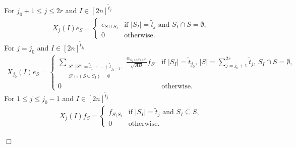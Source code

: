 \documentclass[11pt]{article}
\newcommand{\1}{\mathbf{1}}
\theoremstyle{plain}
\theoremstyle{definition}
\theoremstyle{remark}
\renewenvironment{proof}[1][]{
    	\begin{trivlist}
     	\item[\hspace{\labelsep}{\em\noindent Proof#1:\/}]}
     	{{\hfill$\Box$}
    	\end{trivlist}
  }
\begin{document}
\begin{proof}
    For $j_0+1\leq j\leq 2r$ and $I\in [2n]^{\tilde t_j}$ 
 \begin{align*}
 X_j(I)e_S=
\begin{cases}
   e_{S\cup S_{I}} & \text{if } |S_I|=\tilde t_j \text{  and  }S_{I}\cap  S=\emptyset,\\
  0  & \text{otherwise. } 
\end{cases}
    \end{align*}
    For $j=j_0$ and $I\in [2n]^{\tilde t_{j_0}}$ 
   \begin{align*}
X_{j_0}(I)e_S=
\begin{cases}
  \sum_{\substack{S':|S'|= \widetilde t_1+\dots+\widetilde t_{j_0-1},\\S'\cap(S\cup S_{I})=\emptyset}} \frac{\alpha_{S_I\cup S\cup S'}}{\sqrt{AB} }f_{S'} & \text{if } |S_I|=\tilde t_{j_0}, \, |S|= \sum_{j=j_0+1}^{2r}\widetilde t_{j},\, S_I\cap S=\emptyset,\\
  0 & \text{otherwise}.
\end{cases}
\end{align*}
For $1\leq j\leq j_0-1$ and $I\in [2n]^{\tilde t_j}$ 
 \begin{align*}
 X_j(I)f_S=
\begin{cases}
   f_{S\setminus S_{I}} & \text{if } |S_I|=\tilde t_j \text{  and  }S_{I}\subseteq   S,\\
  0  & \text{otherwise. } 
\end{cases}
    \end{align*}

  
    
    
    
    
    





\end{proof}
\end{document}
